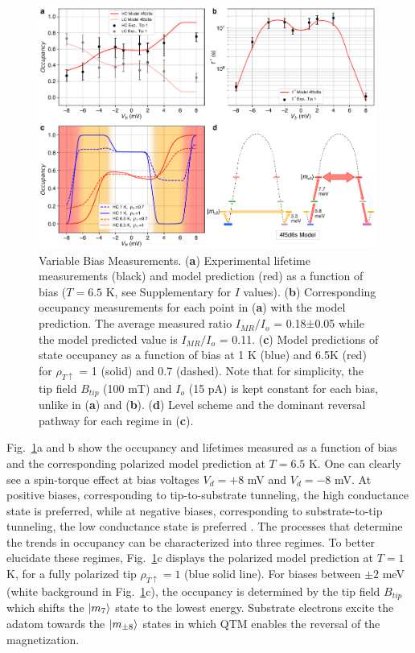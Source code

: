 \documentclass[
reprint,amsmath,amssymb,aps]{revtex4-2}
\begin{document}
\begin{figure}[ht!]
\includegraphics[width=0.99\textwidth]{Fig4_new.pdf}
\caption{Variable Bias Measurements. (\textbf{a}) Experimental lifetime measurements (black) and model prediction (red) as a function of bias ($T = 6.5$ K, see Supplementary for $I$ values). (\textbf{b}) Corresponding occupancy measurements for each point in (\textbf{a}) with the model prediction. The average measured ratio $I_{MR}/I_{o}$ = 0.18±0.05 while the model predicted value is $I_{MR}/I_{o}$ = 0.11. (\textbf{c}) Model predictions of state occupancy as a function of bias at 1 K (blue) and 6.5K (red) for $\rho_{T \uparrow}$ = 1 (solid) and 0.7 (dashed). Note that for simplicity, the tip field $B_{tip}$ (100 mT) and $I_o$ (15 pA) is kept constant for each bias, unlike in (\textbf{a}) and (\textbf{b}). (\textbf{d}) Level scheme and the dominant reversal pathway for each regime in (\textbf{c}).   
\label{fig:bias} }
\end{figure}

Fig.~\ref{fig:bias}a and b show the occupancy and lifetimes measured as a function of bias and the corresponding polarized model prediction at $T=6.5$ K. One can clearly see a spin-torque effect at bias voltages $V_d=+8 $ mV and $V_d=-8 $ mV. At  positive biases, corresponding to tip-to-substrate tunneling, the high conductance state is preferred, while at negative biases, corresponding to substrate-to-tip tunneling, the low conductance state is preferred \cite{Khajetoorians2013,delgadoSpinTransferTorqueSingle2010,balashovInelasticElectronmagnonInteraction2008,krause_joule_2011}. The processes that determine the trends in occupancy can be characterized into three regimes. To better elucidate these regimes, Fig.~\ref{fig:bias}c displays the polarized model prediction at $T=1$ K, for a fully polarized tip $\rho_{T \uparrow} = 1 $ (blue solid line). For biases between $\pm 2$ meV (white background in Fig.~\ref{fig:bias}c), the occupancy is determined by the tip field $B_{tip}$ which shifts the $\ket{m_{7}}$ state to the lowest energy. Substrate electrons excite the adatom towards the $\ket{m_{\pm8}}$ states in which QTM enables the reversal of the magnetization.
\end{document}

